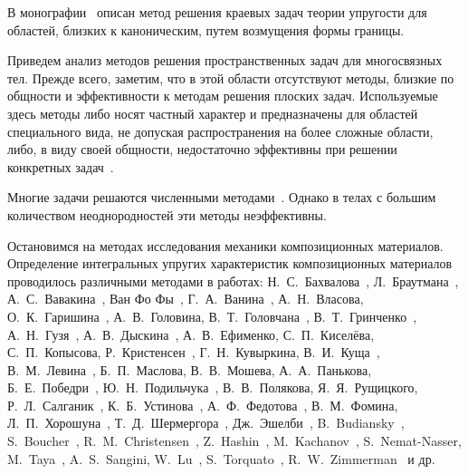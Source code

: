 В монографии~\cite{Guz1984} описан метод решения краевых задач теории упругости для областей, близких к каноническим, путем возмущения формы границы.

Приведем анализ методов решения пространственных задач для многосвязных тел. Прежде всего, заметим, что в этой области отсутствуют методы, близкие по общности и эффективности к методам решения плоских задач. Используемые здесь методы либо носят частный характер и предназначены для областей специального вида, не допуская распространения на более сложные области, либо, в виду своей общности, недостаточно эффективны при решении конкретных задач~\cite{Chen1978-2, Miyamoto, Sheikh, Strenberg}.

Многие задачи решаются численными методами~\cite{Method, Erzhanov}. Однако в телах с большим количеством неоднородностей эти методы неэффективны.

Остановимся на методах исследования механики композиционных материалов. Определение интегральных упругих характеристик композиционных материалов проводилось различными методами в работах: Н.~С.~Бахвалова~\cite{Bahvalov}, Л.~Браутмана~\cite{Brautman}, А.~С.~Вавакина~\cite{Vavakin}, Ван Фо Фы~\cite{VanFoFiKo1971, VanFoFi1971}, Г.~А.~Ванина~\cite{Vanin1985, Vanin1994, Vanin1976, Vanin1980, Vanin1977}, А.~Н.~Власова, О.~К.~Гаришина~\cite{Garishin}, А.~В.~Головина, В.~Т.~Головчана~\cite{Golovchan1974, Golovchan1993, Golovchan1987, Golovchan2000}, В.~Т.~Гринченко~\cite{Grinchenko1965, Grinchenko1967, Grinchenko1985, Grinchenko1978}, А.~Н.~Гузя~\cite{Guz1968}, А.~В.~Дыскина~\cite{Diskin}, А.~В.~Ефименко, С.~П.~Киселёва, С.~П.~Копысова, Р.~Кристенсен~\cite{Kristensen}, Г.~Н.~Кувыркина, В.~И.~Куща~\cite{Kusch1995}, В.~М.~Левина~\cite{Levin}, Б.~П.~Маслова, В.~В.~Мошева, А.~А.~Панькова, Б.~Е.~Победри~\cite{Pobedrya}, Ю.~Н.~Подильчука~\cite{Podilchuk1967, Podilchuk1984}, В.~В.~Полякова, Я.~Я.~Рущицкого, Р.~Л.~Салганик~\cite{Salganik}, К.~Б.~Устинова~\cite{Ustinov}, А.~Ф.~Федотова~\cite{Fedotov}, В.~М.~Фомина, Л.~П.~Хорошуна~\cite{Khoroshun, Khoroshun2000-1, Khoroshun2000-2}, Т.~Д.~Шермергора~\cite{Schermergor}, Дж.~Эшелби~\cite{Eshelbi, Eshelby}, B.~Budiansky~\cite{Budiansky}, S.~Boucher~\cite{Boucher}, R.~M.~Christensen~\cite{Christensen, Christensen1990}, Z.~Hashin~\cite{Hashin, Hashin1983, Hashin1988, Hashin1963}, M.~Kachanov~\cite{Kachanov}, S.~Nemat-Nasser, M.~Taya~\cite{Nemat-Nasser}, A.~S.~Sangini, W.~Lu~\cite{Sangini}, S.~Torquato~\cite{Torquato}, R.~W.~Zimmerman~\cite{Zimmerman} и др.{\sloppy\par}

